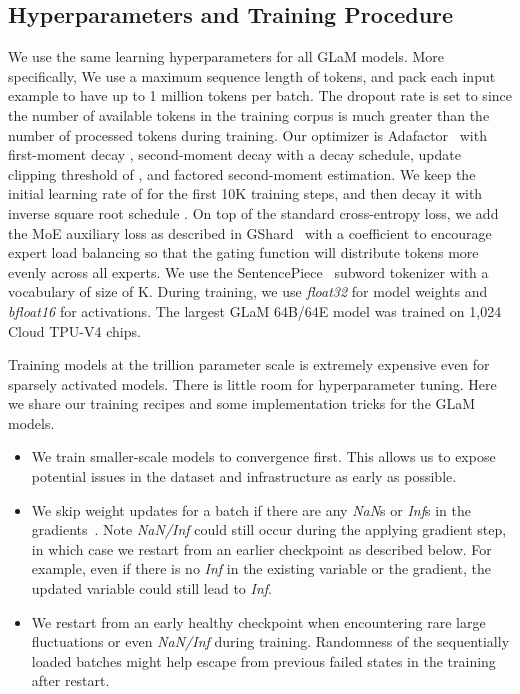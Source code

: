 \documentclass{article}
\newcommand{\glam}{GLaM\xspace}
\begin{document}
\subsection{Hyperparameters and Training Procedure}
We use the same learning hyperparameters for all \glam models. More specifically, We use a maximum sequence length of  tokens, and pack each input example to have up to 1 million tokens per batch. The dropout rate is set to  since the number of available tokens in the training corpus is much greater than the number of processed tokens during training. Our optimizer is Adafactor~\cite{Shazeer2018AdafactorAL} with first-moment decay , second-moment decay  with a  decay schedule, update clipping threshold of , and factored second-moment estimation. We keep the initial learning rate of  for the first 10K training steps, and then decay it with inverse square root schedule . On top of the standard cross-entropy loss, we add the MoE auxiliary loss as described in GShard~\cite{lepikhin2020gshard} with a  coefficient to encourage expert load balancing so that the gating function will distribute tokens more evenly across all experts.  We use the SentencePiece~\cite{Kudo2018SentencePieceAS} subword tokenizer with a vocabulary of size of K. During training, we use \textit{float32} for model weights and \textit{bfloat16} for activations. The largest GLaM 64B/64E model was trained on 1,024 Cloud TPU-V4 chips. 

Training models at the trillion parameter scale is extremely expensive even for sparsely activated models. There is little room for hyperparameter tuning. Here we share our training recipes and some implementation tricks for the \glam models.
\begin{itemize}
    \item We train smaller-scale models to convergence first. This allows us to expose potential issues in the dataset and infrastructure as early as possible.
    \item We skip weight updates for a batch if there are any \textit{NaN}s or \textit{Inf}s in the gradients~\cite{shen2019lingvo}. Note \textit{NaN/Inf} could still occur during the applying gradient step, in which case we restart from an earlier checkpoint as described below. For example, even if there is no \textit{Inf} in the existing variable or the gradient, the updated variable could still lead to \textit{Inf}.
\item We restart from an early healthy checkpoint when encountering rare large fluctuations or even \textit{NaN/Inf} during training. Randomness of the sequentially loaded batches might help escape from previous failed states in the training after restart.
\end{itemize}
\end{document}

